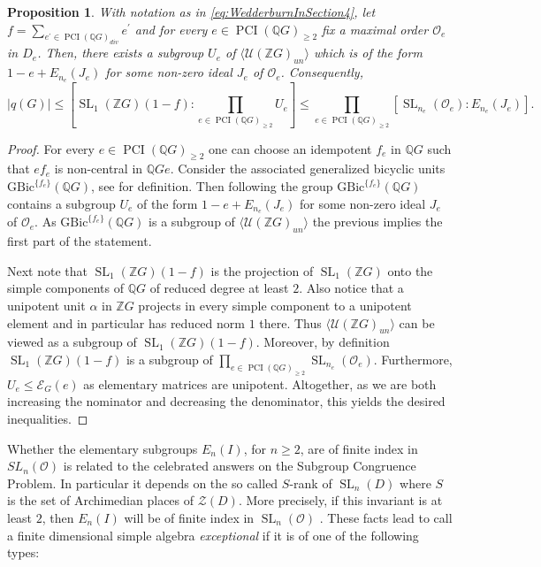 \documentclass[a4paper,10pt]{amsart}
\newtheorem{proposition}[lemma]{Proposition}
\theoremstyle{definition}
\theoremstyle{remark}
\newcommand{\SL}{\operatorname{SL}}
\newcommand\PCI{\operatorname{PCI}}
\renewcommand{\O}{\mathcal{O}}
\newcommand{\U}{{\mathcal U}}
\newcommand{\Z}{{\mathbb Z}}
\newcommand{\Q}{{\mathbb Q}}
\begin{document}
\begin{proposition}\label{th: upper-bound size q(G)}
With notation as in \eqref{eq:WedderburnInSection4}, let $f = \sum_{e^{\prime} \in \PCI(\Q G)_{div}} e^{\prime}$ and for every $e \in \PCI (\Q G)_{\geq 2} $ fix a maximal order $\O_e$ in $D_e$. Then, there exists a subgroup $U_e$ of $\langle  \U(\Z G)_{un} \rangle$ which is of the form $1-e + E_{n_e}(J_e)$ for some non-zero ideal $J_e$ of $\O_e$. Consequently,
$$|q(G)| \leq [\SL_1(\Z G) (1-f) : \prod_{e \in \PCI (\Q G)_{\geq 2}} U_e] \leq \prod_{e \in \PCI (\Q G)_{\geq 2}} [\SL_{n_e}(\O_e) : E_{n_e}(J_e)].$$
\end{proposition}
\begin{proof}
For every $e \in \PCI (\Q G)_{\geq 2}$ one can choose an idempotent $f_e$ in $\Q G$ such that $ef_e$ is non-central in $\Q G e$. Consider the associated generalized bicyclic units $\text{GBic}^{\{f_e \}}(\Q G)$, see \cite[Section 11.2]{GRG1} for definition. Then following \cite[Theorem 6.3]{JJS} the group $\text{GBic}^{\{f_e \}}(\Q G)$ contains a subgroup $U_e$ of the form  $1-e + E_{n_e}(J_e)$ for some non-zero ideal $J_e$ of $\O_e$. As $\text{GBic}^{\{f_e \}}(\Q G)$ is a subgroup of $\langle  \U(\Z G)_{un} \rangle$ the previous implies the first part of the statement. 

Next note that $\SL_1(\Z G) (1-f)$ is the projection of $\SL_1(\Z G)$ onto the simple components of $\Q G$ of reduced degree at least $2$. Also notice that a unipotent unit $\alpha$ in $\Z G$ projects in every simple component to a unipotent element and in particular has reduced norm $1$ there. Thus $\langle  \U(\Z G)_{un} \rangle$ can be viewed as a subgroup of $\SL_1(\Z G) (1-f)$. Moreover, by definition $\SL_1(\Z G) (1-f)$ is a subgroup of $\prod_{e \in \PCI (\Q G)_{\geq 2}} \SL_{n_e}(\O_e).$ Furthermore, $U_e \leq \mathcal{E}_G(e)$ as elementary matrices are unipotent. Altogether, as we are both increasing the nominator and decreasing the denominator, this yields the desired inequalities.
\end{proof}

Whether the elementary subgroups $E_n(I)$, for $n \geq 2$, are of finite index in $SL_n(\O)$ is related to the celebrated answers on the Subgroup Congruence Problem. In particular it depends on the so called $S$-rank of $\SL_n(D)$ where $S$ is the set of Archimedian places of $\mathcal{Z}(D)$. More precisely, if this invariant is at least $2$, then $E_n(I)$ will be of finite index in $\SL_n(\O)$ \cite{BassMilnorSerre, SerreSL2, Vas73, Tits, BakReh}. These facts lead to call a finite dimensional simple algebra {\it exceptional} if it is of one of the following types:
\end{document}
